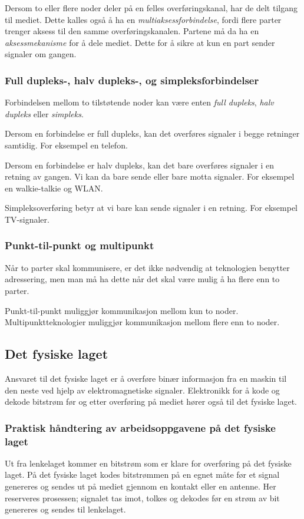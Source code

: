 \documentclass[11pt,a4paper]{article}
\begin{document}
Dersom to eller flere noder deler på en felles overføringskanal, har de delt tilgang til mediet. Dette kalles også å ha en \textit{multiaksessforbindelse}, fordi flere parter trenger aksess til den samme overføringskanalen. Partene må da ha en \textit{aksessmekanisme} for å dele mediet. Dette for å sikre at kun en part sender signaler om gangen. 

\subsubsection{Full dupleks-, halv dupleks-, og simpleksforbindelser}
Forbindelsen mellom to tilstøtende noder kan være enten \textit{full dupleks}, \textit{halv dupleks} eller \textit{simpleks}. 

Dersom en forbindelse er full dupleks, kan det overføres signaler i begge retninger samtidig. For eksempel en telefon.

Dersom en forbindelse er halv dupleks, kan det bare overføres signaler i en retning av gangen. Vi kan da bare sende eller bare motta signaler. For eksempel en walkie-talkie og WLAN.

Simpleksoverføring betyr at vi bare kan sende signaler i en retning. For eksempel TV-signaler.

\subsubsection{Punkt-til-punkt og multipunkt}
Når to parter skal kommunisere, er det ikke nødvendig at teknologien benytter adressering, men man må ha dette når det skal være mulig å ha flere enn to parter.

Punkt-til-punkt muliggjør kommunikasjon mellom kun to noder. Multipunktteknologier muliggjør kommunikasjon mellom flere enn to noder. 

\subsection{Det fysiske laget}
Ansvaret til det fysiske laget er å overføre binær informasjon fra en maskin til den neste ved hjelp av elektromagnetiske signaler.
Elektronikk for å kode og dekode bitstrøm før og etter overføring på mediet hører også til det fysiske laget.

\subsubsection{Praktisk håndtering av arbeidsoppgavene på det fysiske laget}
Ut fra lenkelaget kommer en bitstrøm som er klare for overføring på det fysiske laget. På det fysiske laget kodes bitstrømmen på en egnet måte før et signal genereres og sendes ut på mediet gjennom en kontakt eller en antenne. Her reserveres prosessen; signalet tas imot, tolkes og dekodes før en strøm av bit genereres og sendes til lenkelaget. 
\end{document}
